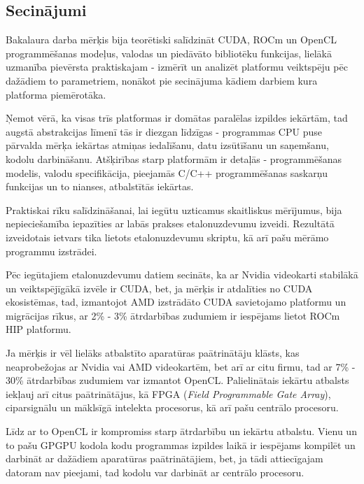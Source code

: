 \begin{center}
    \chapter{Secinājumi}
\end{center}

Bakalaura darba mērķis bija teorētiski salīdzināt CUDA, ROCm un OpenCL
programmēšanas modeļus, valodas un piedāvāto bibliotēku funkcijas, lielākā
uzmanība pievērsta praktiskajam - izmērīt un analizēt platformu veiktspēju pēc
dažādiem to parametriem, nonākot pie secinājuma kādiem darbiem kura platforma
piemērotāka.

Ņemot vērā, ka visas trīs platformas ir domātas paralēlas izpildes iekārtām,
tad augstā abstrakcijas līmenī tās ir diezgan līdzīgas - programmas CPU puse
pārvalda  mērķa iekārtas atmiņas iedalīšanu, datu izsūtīšanu un saņemšanu,
kodolu darbināšanu. Atšķirības starp platformām ir detaļās - programmēšanas
modelis, valodu specifikācija, pieejamās C/C++ programmēšanas  saskarņu
funkcijas un to nianses, atbalstītās iekārtas.

Praktiskai rīku salīdzināšanai, lai iegūtu uzticamus skaitliskus mērījumus, 
bija nepieciešamība iepazīties ar labās prakses etalonuzdevumu izveidi.
Rezultātā izveidotais ietvars tika lietots etalonuzdevumu skriptu, kā arī pašu
mērāmo programmu izstrādei.

Pēc iegūtajiem etalonuzdevumu datiem secināts, ka ar Nvidia videokarti
stabilākā un veiktspējīgākā izvēle ir CUDA, bet, ja mērķis ir atdalīties no
CUDA ekosistēmas, tad, izmantojot AMD izstrādāto CUDA savietojamo platformu un
migrācijas rīkus, ar 2\% - 3\% ātrdarbības zudumiem ir iespējams lietot ROCm HIP
platformu.

Ja mērķis ir vēl lielāks atbalstīto aparatūras paātrinātāju klāsts, kas
neaprobežojas ar Nvidia vai AMD videokartēm, bet arī ar citu firmu, tad ar
7\% - 30\% ātrdarbības zudumiem var izmantot OpenCL. Palielinātais iekārtu
atbalsts iekļauj arī citus paātrinātājus, kā FPGA (\textit{Field Programmable
Gate Array}), ciparsignālu un māklsīgā intelekta procesorus, kā arī pašu
centrālo procesoru.

Līdz ar to OpenCL ir kompromiss starp ātrdarbību un iekārtu atbalstu. Vienu un
to pašu GPGPU kodola kodu programmas  izpildes laikā ir iespējams kompilēt un
darbināt ar dažādiem aparatūras paātrinātājiem, bet, ja tādi  attiecīgajam
datoram nav pieejami, tad kodolu var darbināt ar centrālo procesoru.

